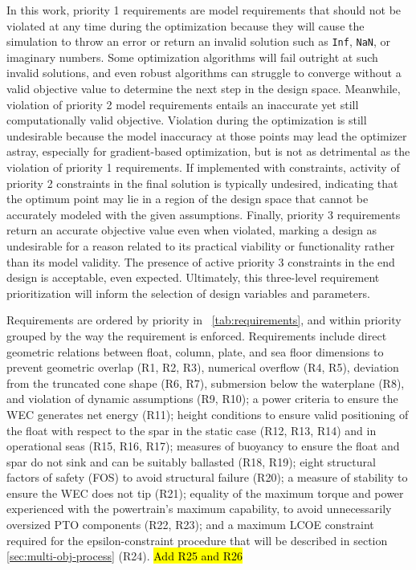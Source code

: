 In this work, priority 1 requirements are model requirements that should not be violated at any time during the optimization because they will cause the simulation to throw an error or return an invalid solution such as \texttt{Inf}, \texttt{NaN}, or imaginary numbers.
Some optimization algorithms will fail outright at such invalid solutions, and even robust algorithms can struggle to converge without a valid objective value to determine the next step in the design space.
Meanwhile, violation of priority 2 model requirements entails an inaccurate yet still computationally valid objective.
Violation during the optimization is still undesirable because the model inaccuracy at those points may lead the optimizer astray, especially for gradient-based optimization, but is not as detrimental as the violation of priority 1 requirements.
If implemented with constraints, activity of priority 2 constraints in the final solution is typically undesired, indicating that the optimum point may lie in a region of the design space that cannot be accurately modeled with the given assumptions.
Finally, priority 3 requirements return an accurate objective value even when violated, marking a design as undesirable for a reason related to its practical viability or functionality rather than its model validity.
The presence of active priority 3 constraints in the end design is acceptable, even expected.
Ultimately, this three-level requirement prioritization will inform the selection of design variables and parameters.

Requirements are ordered by priority in \tablename~\ref{tab:requirements}, and within priority grouped by the way the requirement is enforced.
Requirements include direct geometric relations between float, column, plate, and sea floor dimensions to prevent geometric overlap (R1, R2, R3), numerical overflow (R4, R5), deviation from the truncated cone shape (R6, R7), submersion below the waterplane (R8), and violation of dynamic assumptions (R9, R10); a power criteria to ensure the WEC generates net energy (R11); height conditions to ensure valid positioning of the float with respect to the spar in the static case (R12, R13, R14) and in operational seas (R15, R16, R17); measures of buoyancy to ensure the float and spar do not sink and can be suitably ballasted (R18, R19); eight structural factors of safety (FOS) to avoid structural failure (R20); a measure of stability to ensure the WEC does not tip (R21); equality of the maximum torque and power experienced with the powertrain's maximum capability, to avoid unnecessarily oversized PTO components (R22, R23); and a maximum LCOE constraint required for the epsilon-constraint procedure that will be described in section \ref{sec:multi-obj-process} (R24).
\hl{Add R25 and R26}

